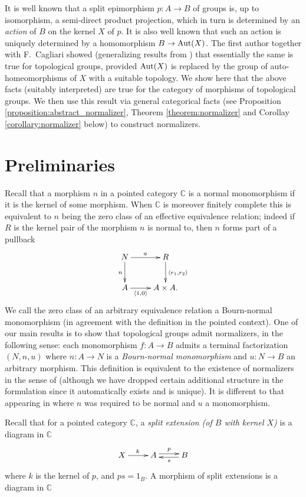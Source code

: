 \documentclass{article}
\newcommand{\C}{\mathbb{C}}
\newcommand{\Aut}{\textnormal{Aut}}
\begin{document}
It is well known that a split epimorphism $p:A\to B$ of groups is, up to isomorphism, a
semi-direct product projection, which in turn is determined by an \emph{action}
of $B$ on the kernel $X$ of $p$. It is also well known that such an action is
uniquely determined by a homomorphism $B\to \Aut(X)$. The first author together
with F.\ Cagliari \cite{CAGLIARI_CLEMENTINO:2019} showed 
(generalizing results from \cite{BORCEUX_CLEMENTINO_MONTOLI:2014}) that
essentially the same is true for topological groups, provided $\Aut(X)$ is
replaced by the group of auto-homeomorphisms of $X$ with a suitable topology.
We show here that the above facts (suitably interpreted) are true for the category of morphisms
of topological groups. We then use this result via general categorical facts
(see Proposition \ref{proposition:abstract_normalizer}, Theorem \ref{theorem:normalizer}
and Corollay \ref{corollary:normalizer} below) to construct normalizers.

\section{Preliminaries}
Recall that a morphism $n$ in a pointed category $\C$ is a normal monomorphism
if it is the kernel of some morphism. When $\C$ is moreover finitely complete
this is equivalent to $n$ being the zero class of an effective equivalence
relation; indeed if $R$ is the kernel pair of the morphism $n$ is normal
to, then $n$ forms part of a pullback
\[
\xymatrix{
N\ar[d]_{n}\ar[r]^{u} &  R\ar[d]^{\langle r_1,r_2\rangle}\\
A \ar[r]_-{\langle 1,0\rangle} & A\times A.
}
\]
We call the zero class of an arbitrary equivalence relation a Bourn-normal
monomorphism (in agreement with the definition \cite{BOURN:2000a} in the pointed context). One of our main results is to show that topological groups admit normalizers,
in the following sense: each monomorphism $f:A\to B$ admits a terminal factorization
$(N,n,u)$ where $n:A\to N$ is a \emph{Bourn-normal monomorphism} and $u:N\to B$ an arbitrary
morphism. This definition is equivalent
to the existence of normalizers in the sense of \cite{BOURN_GRAY:2015} (although we
have dropped certain additional structure in the formulation since it automatically
exists and is unique). It is
different to that appearing in \cite{GRAY:2013b} where $n$ was required to be
normal and $u$ a monomorphism.

Recall that for a pointed category $\C$, a \emph{split extension (of $B$ with kernel $X$)} is a diagram in $\C$
\begin{equation}
\label{equation: a split extension}
\xymatrix{X \ar[r]^{k} & A \ar@<0.5ex>[r]^{p} & B\ar@<0.5ex>[l]^{s}}
\end{equation}
where $k$ is the kernel of $p$, and $ps = 1_B$.  A morphism of split extensions is a diagram in $\C$
\end{document}
